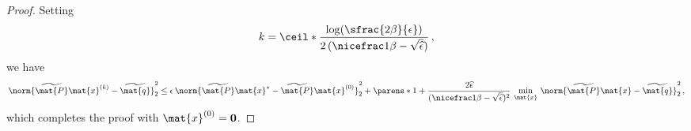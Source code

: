 \begin{proof}
Setting
\[
k = \ceil*{\frac{\log(\sfrac{2\beta}{\epsilon})}{2\,(\nicefrac 1 \beta -\sqrt{\widehat{\epsilon}})}}\,,
\]
we have
\[
    \norm{\widetilde{\mat{P}} \mat{x}^{(k)}-\widetilde{\mat{q}}}_2^2
    \leq
    \epsilon\, \norm{\widetilde{\mat{P}} \mat{x}^{*} - \widetilde{\mat{P}} \mat{x}^{(0)}}_2^2 + \parens*{1+ \frac{2 \widehat{\epsilon}}{(\nicefrac 1  \beta - \sqrt{\widehat{\epsilon}})^2} }\, \min_{\mat{x}}\, \norm{\widetilde{\mat{P}} \mat{x}-\widetilde{\mat{q}}}_2^2\,,
\]
which completes the proof with $\mat{x}^{(0)}=\boldsymbol{0}$.

\end{proof}
